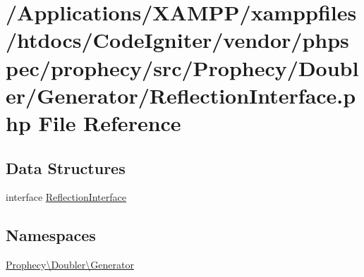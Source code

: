 \hypertarget{_reflection_interface_8php}{}\section{/\+Applications/\+X\+A\+M\+P\+P/xamppfiles/htdocs/\+Code\+Igniter/vendor/phpspec/prophecy/src/\+Prophecy/\+Doubler/\+Generator/\+Reflection\+Interface.php File Reference}
\label{_reflection_interface_8php}
\subsection*{Data Structures}
\begin{DoxyCompactItemize}
\item 
interface \mbox{\hyperlink{interface_prophecy_1_1_doubler_1_1_generator_1_1_reflection_interface}{Reflection\+Interface}}
\end{DoxyCompactItemize}
\subsection*{Namespaces}
\begin{DoxyCompactItemize}
\item 
 \mbox{\hyperlink{namespace_prophecy_1_1_doubler_1_1_generator}{Prophecy\textbackslash{}\+Doubler\textbackslash{}\+Generator}}
\end{DoxyCompactItemize}

